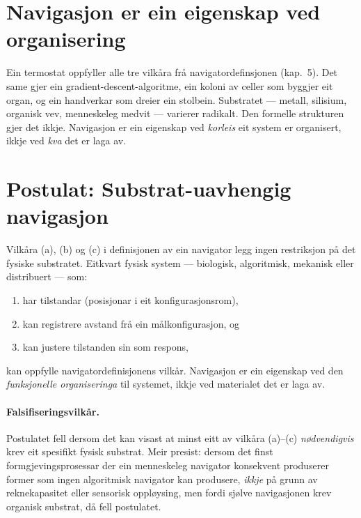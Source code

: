 \section{Navigasjon er ein eigenskap ved organisering}

Ein termostat oppfyller alle tre vilkåra frå navigatordefinsjonen
(kap.~5). Det same gjer ein gradient-descent-algoritme, ein koloni
av celler som byggjer eit organ, og ein handverkar som dreier ein
stolbein. Substratet --- metall, silisium, organisk vev,
menneskeleg medvit --- varierer radikalt. Den formelle strukturen
gjer det ikkje. Navigasjon er ein eigenskap ved \emph{korleis} eit
system er organisert, ikkje ved \emph{kva} det er laga av.


\section{Postulat: Substrat-uavhengig navigasjon}

\begin{postmark}\label{post:L.7.1}
Vilkåra (a), (b) og (c) i definisjonen av ein navigator legg ingen
restriksjon på det fysiske substratet. Eitkvart fysisk system ---
biologisk, algoritmisk, mekanisk eller distribuert --- som:
\begin{enumerate}[label=(\roman*),nosep]
  \item har tilstandar (posisjonar i eit konfigurasjonsrom),
  \item kan registrere avstand frå ein målkonfigurasjon, og
  \item kan justere tilstanden sin som respons,
\end{enumerate}
kan oppfylle navigatordefinisjonens vilkår.
Navigasjon er ein eigenskap ved den \emph{funksjonelle
organiseringa} til systemet, ikkje ved materialet det er laga av.
\end{postmark}

\paragraph{Falsifiseringsvilkår.}
Postulatet fell dersom det kan visast at minst eitt av vilkåra
(a)--(c) \emph{nødvendigvis} krev eit spesifikt fysisk substrat.
Meir presist: dersom det finst formgjevingsprosessar der ein
menneskeleg navigator konsekvent produserer former som ingen
algoritmisk navigator kan produsere, \emph{ikkje} på grunn av
reknekapasitet eller sensorisk oppløysing, men fordi sjølve
navigasjonen krev organisk substrat, då fell postulatet.

